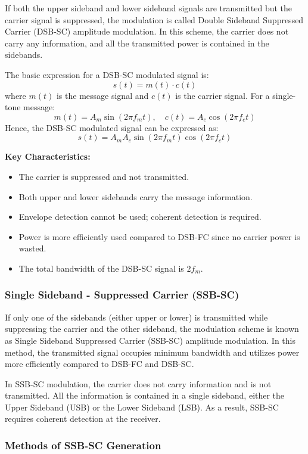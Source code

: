 If both the upper sideband and lower sideband signals are transmitted but the carrier signal is suppressed, the modulation is called Double Sideband Suppressed Carrier (DSB-SC) amplitude modulation. In this scheme, the carrier does not carry any information, and all the transmitted power is contained in the sidebands.

The basic expression for a DSB-SC modulated signal is:
\[s(t) = m(t) \cdot c(t)\] where $m(t)$ is the message signal and $c(t)$ is the carrier signal. 
For a single-tone message: 
\[m(t) = A_m \sin(2 \pi f_m t), \quad c(t) = A_c \cos(2 \pi f_c t)\]
Hence, the DSB-SC modulated signal can be expressed as:
\[s(t) = A_m A_c \sin(2 \pi f_m t) \cos(2 \pi f_c t)\]

\textbf{Key Characteristics:}

\begin{itemize}[itemsep=2pt]
    \item The carrier is suppressed and not transmitted.
    \item Both upper and lower sidebands carry the message information.
    \item Envelope detection cannot be used; coherent detection is required.
    \item Power is more efficiently used compared to DSB-FC since no carrier power is wasted.
    \item The total bandwidth of the DSB-SC signal is $2 f_m$.
\end{itemize}


\subsubsection*{Single Sideband - Suppressed Carrier (SSB-SC)}

If only one of the sidebands (either upper or lower) is transmitted while suppressing the carrier and the other sideband, the modulation scheme is known as Single Sideband Suppressed Carrier (SSB-SC) amplitude modulation. In this method, the transmitted signal occupies minimum bandwidth and utilizes power more efficiently compared to DSB-FC and DSB-SC.

In SSB-SC modulation, the carrier does not carry information and is not transmitted. All the information is contained in a single sideband, either the Upper Sideband (USB) or the Lower Sideband (LSB). As a result, SSB-SC requires coherent detection at the receiver.

\subsubsection*{Methods of SSB-SC Generation}

